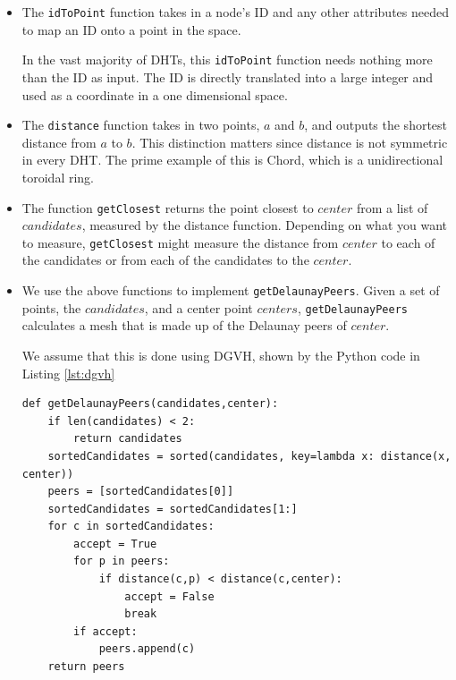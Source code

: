 \documentclass[11pt,conference]{IEEEtran}
\begin{document}
\begin{itemize}

\item The \texttt{idToPoint} function takes in a node's ID and any other attributes needed to map an ID onto a point in the space.

In the vast majority of DHTs, this \texttt{idToPoint} function needs nothing more than the ID as input.
The ID is directly translated into a large integer and used as a coordinate in a one dimensional space.


\item The \texttt{distance} function takes in two points, $a$ and $b$, and outputs the shortest distance from $a$ to $b$.
This distinction matters since distance is not symmetric in every DHT.
The prime example of this is Chord, which is a unidirectional toroidal ring.



\item The function \texttt{getClosest} returns the point closest to $ center$ from a list of $ candidates$, measured by the distance function.
Depending on what you want to measure, \texttt{getClosest} might measure the distance from $ center$ to each of the candidates or from each of the candidates to the $ center$.

\item We use the above functions to implement  \texttt{getDelaunayPeers}.
Given a set of points, the $ candidates$, and a center point $ centers$, \texttt{getDelaunayPeers} calculates a mesh that is made up of the Delaunay peers of $ center$.

We assume that this is done using DGVH, shown by the Python code 
in Listing \ref{lst:dgvh}

\begin{lstlisting}[basicstyle=\scriptsize\ttfamily,  breaklines=true, caption={\texttt{getDelaunayPeers()}}, label={lst:dgvh}, frame=single] 
def getDelaunayPeers(candidates,center):    
	if len(candidates) < 2:
		return candidates
	sortedCandidates = sorted(candidates, key=lambda x: distance(x, center))
	peers = [sortedCandidates[0]] 
	sortedCandidates = sortedCandidates[1:]
	for c in sortedCandidates:
		accept = True
		for p in peers:
			if distance(c,p) < distance(c,center):
				accept = False
				break
		if accept:
			peers.append(c)
	return peers
\end{lstlisting}



\end{itemize}
\end{document}
